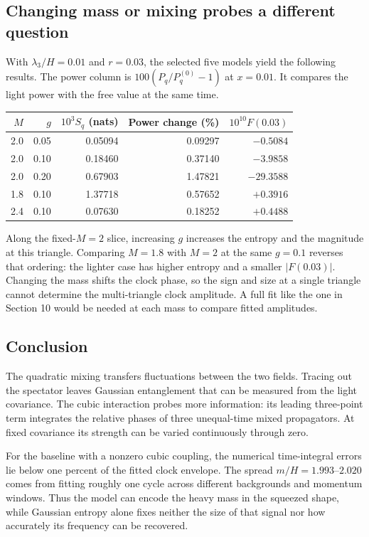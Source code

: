 \clearpage\subsection{Changing mass or mixing probes a different question}
With $\lambda_3/H=0.01$ and $r=0.03$, the selected five models yield the following results. The power column is $100(P_q/P_q^{(0)}-1)$ at $x=0.01$. It compares the light power with the free value at the same time.
\begin{center}\begin{tabular}{rrrrr}\toprule $M$ & $g$ & $10^3 S_q$ (nats) & Power change (\%) & $10^{10}F(0.03)$\\\midrule
2.0 & 0.05 & 0.05094 & 0.09297 & $-0.5084$\\
2.0 & 0.10 & 0.18460 & 0.37140 & $-3.9858$\\
2.0 & 0.20 & 0.67903 & 1.47821 & $-29.3588$\\
1.8 & 0.10 & 1.37718 & 0.57652 & $+0.3916$\\
2.4 & 0.10 & 0.07630 & 0.18252 & $+0.4488$\\\bottomrule\end{tabular}\end{center}
Along the fixed-$M=2$ slice, increasing $g$ increases the entropy and the magnitude at this triangle. Comparing $M=1.8$ with $M=2$ at the same $g=0.1$ reverses that ordering: the lighter case has higher entropy and a smaller $|F(0.03)|$. Changing the mass shifts the clock phase, so the sign and size at a single triangle cannot determine the multi-triangle clock amplitude. A full fit like the one in Section 10 would be needed at each mass to compare fitted amplitudes.

\subsection{Conclusion}
The quadratic mixing transfers fluctuations between the two fields. Tracing out the spectator leaves Gaussian entanglement that can be measured from the light covariance. The cubic interaction probes more information: its leading three-point term integrates the relative phases of three unequal-time mixed propagators. At fixed covariance its strength can be varied continuously through zero.

For the baseline with a nonzero cubic coupling, the numerical time-integral errors lie below one percent of the fitted clock envelope. The spread $m/H=1.993$--$2.020$ comes from fitting roughly one cycle across different backgrounds and momentum windows. Thus the model can encode the heavy mass in the squeezed shape, while Gaussian entropy alone fixes neither the size of that signal nor how accurately its frequency can be recovered.

